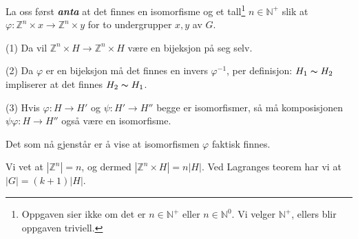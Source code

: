 \documentclass[a4paper,norsk,twocolumn,10pt]{article}
\begin{document}
La oss først \textbf{\textit{anta}} at det finnes en isomorfisme og et
tall\footnote{Oppgaven sier ikke om det er $n \in \mathbb{N}^+$ eller $n \in
\mathbb{N}^0$. Vi velger $\mathbb{N}^+$, ellers blir oppgaven triviell.} $n \in
\mathbb{N}^+$ slik at $\varphi\colon \mathbb{Z}^n \times x \rightarrow
\mathbb{Z}^n \times y$ for to undergrupper $x,y$ av $G$.

(1) Da vil $\mathbb{Z}^n \times H \rightarrow \mathbb{Z}^n \times H$ være en
bijeksjon på seg selv.

(2) Da $\varphi$ er en bijeksjon må det finnes en invers $\varphi^{-1}$, per
definisjon: $H_1 \thicksim H_2$ impliserer at det finnes $H_2 \thicksim H_1$.

(3) Hvis $\varphi\colon H \rightarrow H'$ og $\psi\colon H' \rightarrow H''$ begge
er isomorfismer, så må komposisjonen $\psi\varphi\colon H \rightarrow H''$ også
være en isomorfisme.

Det som nå gjenstår er å vise at isomorfismen $\varphi$ faktisk finnes.

Vi vet at $|\mathbb{Z}^n|=n$, og dermed $|\mathbb{Z}^n \times H| = n|H|$. Ved
Lagranges teorem har vi at $|G|=(k+1)|H|$.
\end{document}
